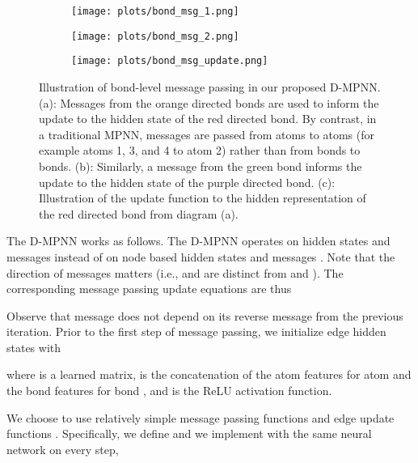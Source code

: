 \documentclass[journal=jcisd8,manuscript=article]{achemso}
\begin{document}
\begin{figure}
    \centering
\begin{minipage}{.45\textwidth}
        \begin{subfigure}{\textwidth}
            \texttt{[image: plots/bond\_msg\_1.png]}
            \caption{}
            \label{fig:bond_message_passinga}
        \end{subfigure}
        \begin{subfigure}{\textwidth}
            \texttt{[image: plots/bond\_msg\_2.png]}
            \caption{}
            \label{fig:bond_message_passingb}
        \end{subfigure}
    \end{minipage}
    \hfill
    \begin{subfigure}{.5\textwidth}
        \texttt{[image: plots/bond\_msg\_update.png]}
        \caption{}
        \label{fig:bond_message_passingc}
    \end{subfigure}
    \caption{Illustration of bond-level message passing in our proposed D-MPNN. (a): Messages from the orange directed bonds are used to inform the update to the hidden state of the red directed bond. By contrast, in a traditional MPNN, messages are passed from atoms to atoms (for example atoms 1, 3, and 4 to atom 2) rather than from bonds to bonds. (b): Similarly, a message from the green bond informs the update to the hidden state of the purple directed bond. (c): Illustration of the update function to the hidden representation of the red directed bond from diagram (a).}
    \label{fig:bond_message_passing}
\end{figure}

The D-MPNN works as follows. The D-MPNN operates on hidden states  and messages  instead of on node based hidden states  and messages . Note that the direction of messages matters (i.e.,  and  are distinct from  and ). The corresponding message passing update equations are thus

Observe that message  does not depend on its reverse message  from the previous iteration.
Prior to the first step of message passing, we initialize edge hidden states with

where  is a learned matrix,  is the concatenation of the atom features  for atom  and the bond features  for bond , and  is the ReLU activation function\cite{nair2010relu}.

We choose to use relatively simple message passing functions  and edge update functions . Specifically, we define  and we implement  with the same neural network on every step,
\end{document}
